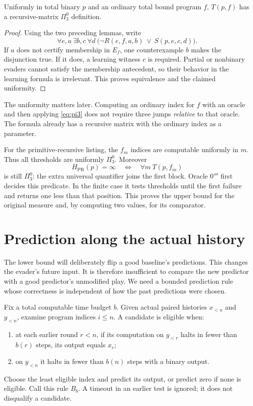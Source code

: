 \documentclass[11pt]{article}
\begin{document}
\begin{proposition}\label{prop:threshold}
Uniformly in total binary $p$ and an ordinary total bound program $f$,
$T(p,f)$ has a recursive-matrix $\Pi^0_3$ definition.
\end{proposition}
\begin{proof}
Using the two preceding lemmas, write
\begin{equation}\label{eq:pi3}
 \forall e,a\ \exists b,c\ \forall d\
 \bigl(\neg R(e,f,a,b)\ \lor\ S(p,e,c,d)\bigr).
\end{equation}
If $a$ does not certify membership in $E_f$, one counterexample $b$
makes the disjunction true. If it does, a learning witness $c$ is
required. Partial or nonbinary evaders cannot satisfy the membership
antecedent, so their behavior in the learning formula is irrelevant.
This proves equivalence and the claimed uniformity.
\end{proof}

The uniformity matters later. Computing an ordinary index for $f$
with an oracle and then applying \eqref{eq:pi3} does not require
three jumps \emph{relative} to that oracle. The formula already has
a recursive matrix with the ordinary index as a parameter.

For the primitive-recursive listing, the $f_m$ indices are computable
uniformly in $m$. Thus all thresholds are uniformly $\Pi^0_3$.
Moreover
\[
 H_{\mathrm{PR}}(p)=\infty\quad\Longleftrightarrow\quad
 \forall m\ T(p,f_m)
\]
is still $\Pi^0_3$: the extra universal quantifier joins the first
block. Oracle $0'''$ first decides this predicate. In the finite case
it tests thresholds until the first failure and returns one less
than that position. This proves the upper bound for the original
measure and, by computing two values, for its comparator.

\section{Prediction along the actual history}

The lower bound will deliberately flip a good baseline's predictions.
This changes the evader's future input. It is therefore insufficient
to compare the new predictor with a good predictor's unmodified play.
We need a bounded prediction rule whose correctness is independent
of how the past predictions were chosen.

Fix a total computable time budget $b$. Given actual paired histories
$x_{<n}$ and $y_{<n}$, examine program indices $i\le n$. A candidate
is eligible when:
\begin{enumerate}
\item at each earlier round $r<n$, if its computation on $y_{<r}$
      halts in fewer than $b(r)$ steps, its output equals $x_r$;
\item on $y_{<n}$ it halts in fewer than $b(n)$ steps with a binary
      output.
\end{enumerate}
Choose the least eligible index and predict its output, or predict
zero if none is eligible. Call this rule $B_b$. A timeout in an
earlier test is ignored; it does not disqualify a candidate.
\end{document}
